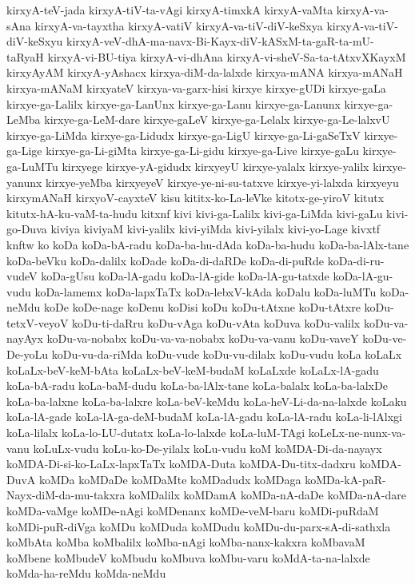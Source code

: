{kirxyA-teV-jada
kirxyA-tiV-ta-vAgi
kirxyA-timxkA
kirxyA-vaMta
kirxyA-va-sAna
kirxyA-va-tayxtha
kirxyA-vatiV
kirxyA-va-tiV-diV-keSxya
kirxyA-va-tiV-diV-keSxyu
kirxyA-veV-dhA-ma-navx-Bi-Kayx-diV-kASxM-ta-gaR-ta-mU-taRyaH
kirxyA-vi-BU-tiya
kirxyA-vi-dhAna
kirxyA-vi-sheV-Sa-ta-tAtxvXKayxM
kirxyAyAM
kirxyA-yAshacx
kirxya-diM-da-lalxde
kirxya-mANA
kirxya-mANaH
kirxya-mANaM
kirxyateV
kirxya-va-garx-hisi
kirxye
kirxye-gUDi
kirxye-gaLa
kirxye-ga-Lalilx
kirxye-ga-LanUnx
kirxye-ga-Lanu
kirxye-ga-Lanunx
kirxye-ga-LeMba
kirxye-ga-LeM-dare
kirxye-gaLeV
kirxye-ga-Lelalx
kirxye-ga-Le-lalxvU
kirxye-ga-LiMda
kirxye-ga-Lidudx
kirxye-ga-LigU
kirxye-ga-Li-gaSeTxV
kirxye-ga-Lige
kirxye-ga-Li-giMta
kirxye-ga-Li-gidu
kirxye-ga-Live
kirxye-gaLu
kirxye-ga-LuMTu
kirxyege
kirxye-yA-gidudx
kirxyeyU
kirxye-yalalx
kirxye-yalilx
kirxye-yanunx
kirxye-yeMba
kirxyeyeV
kirxye-ye-ni-su-tatxve
kirxye-yi-lalxda
kirxyeyu
kirxymANaH
kirxyoV-cayxteV
kisu
kititx-ko-La-leVke
kitotx-ge-yiroV
kitutx
kitutx-hA-ku-vaM-ta-hudu
kitxnf
kivi
kivi-ga-Lalilx
kivi-ga-LiMda
kivi-gaLu
kivi-go-Duva
kiviya
kiviyaM
kivi-yalilx
kivi-yiMda
kivi-yilalx
kivi-yo-Lage
kivxtf
knftw
ko
koDa
koDa-bA-radu
koDa-ba-hu-dAda
koDa-ba-hudu
koDa-ba-lAlx-tane
koDa-beVku
koDa-dalilx
koDade
koDa-di-daRDe
koDa-di-puRde
koDa-di-ru-vudeV
koDa-gUsu
koDa-lA-gadu
koDa-lA-gide
koDa-lA-gu-tatxde
koDa-lA-gu-vudu
koDa-lamemx
koDa-lapxTaTx
koDa-lebxV-kAda
koDalu
koDa-luMTu
koDa-neMdu
koDe
koDe-nage
koDenu
koDisi
koDu
koDu-tAtxne
koDu-tAtxre
koDu-tetxV-veyoV
koDu-ti-daRru
koDu-vAga
koDu-vAta
koDuva
koDu-valilx
koDu-va-nayAyx
koDu-va-nobabx
koDu-va-va-nobabx
koDu-va-vanu
koDu-vaveY
koDu-ve-De-yoLu
koDu-vu-da-riMda
koDu-vude
koDu-vu-dilalx
koDu-vudu
koLa
koLaLx
koLaLx-beV-keM-bAta
koLaLx-beV-keM-budaM
koLaLxde
koLaLx-lA-gadu
koLa-bA-radu
koLa-baM-dudu
koLa-ba-lAlx-tane
koLa-balalx
koLa-ba-lalxDe
koLa-ba-lalxne
koLa-ba-lalxre
koLa-beV-keMdu
koLa-heV-Li-da-na-lalxde
koLaku
koLa-lA-gade
koLa-lA-ga-deM-budaM
koLa-lA-gadu
koLa-lA-radu
koLa-li-lAlxgi
koLa-lilalx
koLa-lo-LU-dutatx
koLa-lo-lalxde
koLa-luM-TAgi
koLeLx-ne-nunx-va-vanu
koLuLx-vudu
koLu-ko-De-yilalx
koLu-vudu
koM
koMDA-Di-da-nayayx
koMDA-Di-si-ko-LaLx-lapxTaTx
koMDA-Duta
koMDA-Du-titx-dadxru
koMDA-DuvA
koMDa
koMDaDe
koMDaMte
koMDadudx
koMDaga
koMDa-kA-paR-Nayx-diM-da-mu-takxra
koMDalilx
koMDamA
koMDa-nA-daDe
koMDa-nA-dare
koMDa-vaMge
koMDe-nAgi
koMDenanx
koMDe-veM-baru
koMDi-puRdaM
koMDi-puR-diVga
koMDu
koMDuda
koMDudu
koMDu-du-parx-sA-di-sathxla
koMbAta
koMba
koMbalilx
koMba-nAgi
koMba-nanx-kakxra
koMbavaM
koMbene
koMbudeV
koMbudu
koMbuva
koMbu-varu
koMdA-ta-na-lalxde
koMda-ha-reMdu
koMda-neMdu
}
